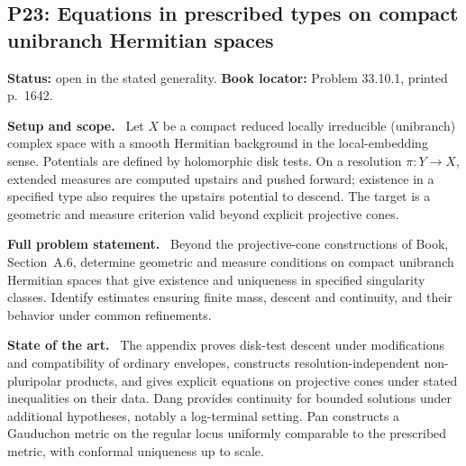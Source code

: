 \documentclass[11pt]{article}
\newcommand{\field}[1]{\par\medskip\noindent\textbf{#1.}\ }
\begin{document}
\subsection{P23: Equations in prescribed types on compact unibranch Hermitian spaces}
\label{P23}
\noindent\textbf{Status:} open in the stated generality. \textbf{Book locator:} Problem 33.10.1, printed p.~1642.
\field{Setup and scope} Let $X$ be a compact reduced locally irreducible (unibranch) complex space with a smooth Hermitian background in the local-embedding sense. Potentials are defined by holomorphic disk tests. On a resolution $\pi:Y\to X$, extended measures are computed upstairs and pushed forward; existence in a specified type also requires the upstairs potential to descend. The target is a geometric and measure criterion valid beyond explicit projective cones.
\field{Full problem statement} Beyond the projective-cone constructions of Book, Section~A.6, determine geometric and measure conditions on compact unibranch Hermitian spaces that give existence and uniqueness in specified singularity classes. Identify estimates ensuring finite mass, descent and continuity, and their behavior under common refinements.
\field{State of the art} The appendix proves disk-test descent under modifications and compatibility of ordinary envelopes, constructs resolution-independent non-pluripolar products, and gives explicit equations on projective cones under stated inequalities on their data. Dang provides continuity for bounded solutions under additional hypotheses, notably a log-terminal setting. Pan constructs a Gauduchon metric on the regular locus uniformly comparable to the prescribed metric, with conformal uniqueness up to scale.
\end{document}
